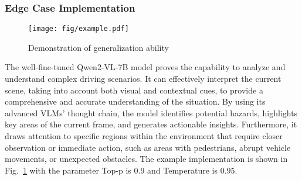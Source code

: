 \subsubsection{Edge Case Implementation}
\begin{figure}[ht]
    \centering
    \texttt{[image: fig/example.pdf]}
    \caption{Demonstration of generalization ability}
    \label{fig:example_edge_case}
\end{figure}
The well-fine-tuned Qwen2-VL-7B model proves the capability to analyze and understand complex driving scenarios. It can effectively interpret the current scene, taking into account both visual and contextual cues, to provide a comprehensive and accurate understanding of the situation. By using its advanced VLMs' thought chain, the model identifies potential hazards, highlights key areas of the current frame, and generates actionable insights. Furthermore, it draws attention to specific regions within the environment that require closer observation or immediate action, such as areas with pedestrians, abrupt vehicle movements, or unexpected obstacles. The example implementation is shown in Fig.~\ref{fig:example_edge_case} with the parameter Top-p is $0.9$ and Temperature is $0.95$.
